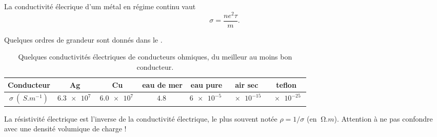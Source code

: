 \documentclass[12pt,fancy]{cours}%
\begin{document}
 \begin{theorem}\label{form:}
  La conductivité élecrique d'um métal en régime continu vaut
  $$\sigma = \frac{ne^2\tau}{m}.$$
 \end{theorem}
Quelques ordres de grandeur sont donnés dans le .
  \begin{table}[H]
    \centering
    \renewcommand{\arraystretch}{1.2}
    \begin{tabular}{|c|c|c|c|c|c|c|}
      \hline
      Conducteur & Ag & Cu & eau de mer & eau pure & air sec & teflon  \\
      \hline
      $\sigma ~(\SI{}{S.m^{-1}})$ &  $\SI{6.3e7}{}$ & $\SI{6.0e7}{}$  & $\SI{4.8}{}$ & $\SI{6e-5}{}$ & $\SI{e-15}{}$ & $\SI{e-25}{}$\\
      \hline
    \end{tabular}
    \caption{Quelques conductivités électriques de conducteurs ohmiques, du meilleur au moins bon conducteur.}
    \label{tab:conductivite}
    
  \end{table}


  \begin{remarque}
  La résistivité électrique est l'inverse de la conductivité électrique, le plus souvent notée $\rho=1/\sigma$ (en $\SI{}{\ohm.m}$). Attention à ne pas confondre avec une densité volumique de charge !
  \end{remarque}

\end{document}
